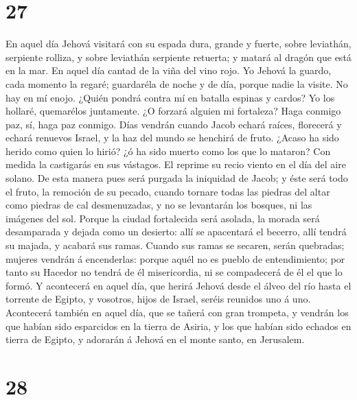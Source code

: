 \hypertarget{section-26}{%
\section{27}\label{section-26}}

 En aquel día Jehová visitará con su espada dura, grande y
fuerte, sobre leviathán, serpiente rolliza, y sobre leviathán serpiente
retuerta; y matará al dragón que está en la mar.  En aquel
día cantad de la viña del vino rojo.  Yo Jehová la guardo,
cada momento la regaré; guardaréla de noche y de día, porque nadie la
visite.  No hay en mí enojo. ¿Quién pondrá contra mí en
batalla espinas y cardos? Yo los hollaré, quemarélos juntamente.
 ¿O forzará alguien mi fortaleza? Haga conmigo paz, sí,
haga paz conmigo.  Días vendrán cuando Jacob echará
raíces, florecerá y echará renuevos Israel, y la haz del mundo se
henchirá de fruto.  ¿Acaso ha sido herido como quien lo
hirió? ¿ó ha sido muerto como los que lo mataron?  Con
medida la castigarás en sus vástagos. El reprime su recio viento en el
día del aire solano.  De esta manera pues será purgada la
iniquidad de Jacob; y éste será todo el fruto, la remoción de su pecado,
cuando tornare todas las piedras del altar como piedras de cal
desmenuzadas, y no se levantarán los bosques, ni las imágenes del sol.
 Porque la ciudad fortalecida será asolada, la morada
será desamparada y dejada como un desierto: allí se apacentará el
becerro, allí tendrá su majada, y acabará sus ramas. 
Cuando sus ramas se secaren, serán quebradas; mujeres vendrán á
encenderlas: porque aquél no es pueblo de entendimiento; por tanto su
Hacedor no tendrá de él misericordia, ni se compadecerá de él el que lo
formó.  Y acontecerá en aquel día, que herirá Jehová
desde el álveo del río hasta el torrente de Egipto, y vosotros, hijos de
Israel, seréis reunidos uno á uno.  Acontecerá también en
aquel día, que se tañerá con gran trompeta, y vendrán los que habían
sido esparcidos en la tierra de Asiria, y los que habían sido echados en
tierra de Egipto, y adorarán á Jehová en el monte santo, en Jerusalem.

\hypertarget{section-27}{%
\section{28}\label{section-27}}

